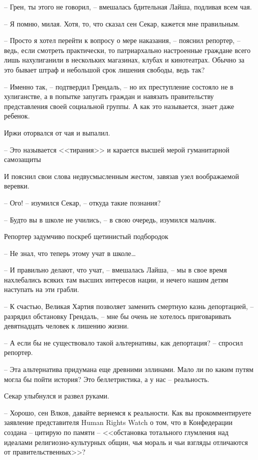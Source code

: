 -- Грен, ты этого не говорил, -- вмешалась бдительная Лайша, подливая всем чая.

-- Я помню, милая. Хотя, то, что сказал сен Секар, кажется мне правильным.

-- Просто я хотел перейти к вопросу о мере наказания, -- пояснил репортер, -- ведь, если смотреть практически, то патриархально настроенные граждане всего лишь нахулиганили в нескольких магазинах, клубах и кинотеатрах. Обычно за это бывает штраф и небольшой срок лишения свободы, ведь так?

-- Именно так, -- подтвердил Грендаль, -- но их преступление состояло не в хулиганстве, а в попытке запугать граждан и навязать правительству представления своей социальной группы. А как это называется, знает даже ребенок.

Иржи оторвался от чая и выпалил.

-- Это называется <<тирания>> и карается высшей мерой гуманитарной самозащиты

И пояснил свои слова недвусмысленным жестом, завязав узел воображаемой веревки.

-- Ого! -- изумился Секар, -- откуда такие познания?

-- Будто вы в школе не учились, -- в свою очередь, изумился мальчик.

Репортер задумчиво поскреб щетинистый подбородок

-- Не знал, что теперь этому учат в школе\ldots{}

-- И правильно делают, что учат, -- вмешалась Лайша, -- мы в свое время нахлебались всяких там высших интересов нации, и нечего нашим детям наступать на эти грабли.

-- К счастью, Великая Хартия позволяет заменить смертную казнь депортацией, -- разрядил обстановку Грендаль, -- мне бы очень не хотелось приговаривать девятнадцать человек к лишению жизни.

-- А если бы не существовало такой альтернативы, как депортация? -- спросил репортер.

-- Эта альтернатива придумана еще древними эллинами. Мало ли по каким путям могла бы пойти история? Это беллетристика, а у нас -- реальность.

Секар улыбнулся и развел руками.

-- Хорошо, сен Влков, давайте вернемся к реальности. Как вы прокомментируете заявление представителя Human Rights Watch о том, что в Конфедерации создана -- цитирую по памяти -- <<обстановка тотального глумления над идеалами религиозно-культурных общин, чья мораль и чьи взгляды отличаются от правительственных>>?

